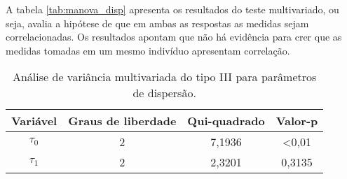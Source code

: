 A tabela \autoref{tab:manova_disp} apresenta os resultados do teste multivariado, ou seja, avalia a hipótese de que em ambas as respostas as medidas sejam correlacionadas. Os resultados apontam que não há evidência para crer que as medidas tomadas em um mesmo indivíduo apresentam correlação.

\begin{table}[H]
\centering
\begin{tabular}{cccc}
\hline
Variável               & Graus de liberdade & Qui-quadrado & Valor-p        \\ \hline
$\tau_0$ & 2                  & 7,1936       & \textless 0,01 \\
$\tau_1$ & 2                  & 2,3201       & 0,3135         \\ \hline
\end{tabular}
\caption{Análise de variância multivariada do tipo III para parâmetros de dispersão.}
\label{tab:manova_disp}
\end{table}


